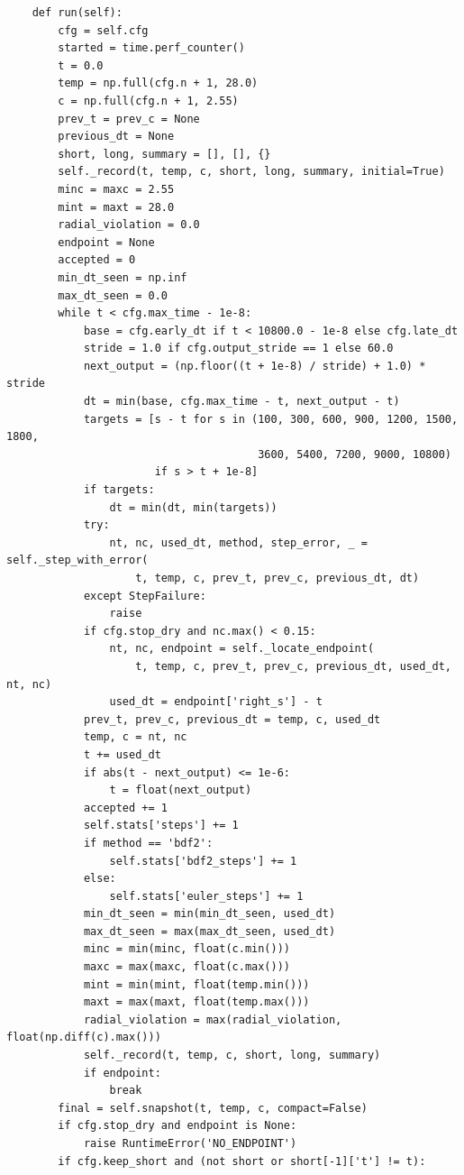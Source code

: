 \begin{verbatim}
    def run(self):
        cfg = self.cfg
        started = time.perf_counter()
        t = 0.0
        temp = np.full(cfg.n + 1, 28.0)
        c = np.full(cfg.n + 1, 2.55)
        prev_t = prev_c = None
        previous_dt = None
        short, long, summary = [], [], {}
        self._record(t, temp, c, short, long, summary, initial=True)
        minc = maxc = 2.55
        mint = maxt = 28.0
        radial_violation = 0.0
        endpoint = None
        accepted = 0
        min_dt_seen = np.inf
        max_dt_seen = 0.0
        while t < cfg.max_time - 1e-8:
            base = cfg.early_dt if t < 10800.0 - 1e-8 else cfg.late_dt
            stride = 1.0 if cfg.output_stride == 1 else 60.0
            next_output = (np.floor((t + 1e-8) / stride) + 1.0) * stride
            dt = min(base, cfg.max_time - t, next_output - t)
            targets = [s - t for s in (100, 300, 600, 900, 1200, 1500, 1800,
                                       3600, 5400, 7200, 9000, 10800)
                       if s > t + 1e-8]
            if targets:
                dt = min(dt, min(targets))
            try:
                nt, nc, used_dt, method, step_error, _ = self._step_with_error(
                    t, temp, c, prev_t, prev_c, previous_dt, dt)
            except StepFailure:
                raise
            if cfg.stop_dry and nc.max() < 0.15:
                nt, nc, endpoint = self._locate_endpoint(
                    t, temp, c, prev_t, prev_c, previous_dt, used_dt, nt, nc)
                used_dt = endpoint['right_s'] - t
            prev_t, prev_c, previous_dt = temp, c, used_dt
            temp, c = nt, nc
            t += used_dt
            if abs(t - next_output) <= 1e-6:
                t = float(next_output)
            accepted += 1
            self.stats['steps'] += 1
            if method == 'bdf2':
                self.stats['bdf2_steps'] += 1
            else:
                self.stats['euler_steps'] += 1
            min_dt_seen = min(min_dt_seen, used_dt)
            max_dt_seen = max(max_dt_seen, used_dt)
            minc = min(minc, float(c.min()))
            maxc = max(maxc, float(c.max()))
            mint = min(mint, float(temp.min()))
            maxt = max(maxt, float(temp.max()))
            radial_violation = max(radial_violation, float(np.diff(c).max()))
            self._record(t, temp, c, short, long, summary)
            if endpoint:
                break
        final = self.snapshot(t, temp, c, compact=False)
        if cfg.stop_dry and endpoint is None:
            raise RuntimeError('NO_ENDPOINT')
        if cfg.keep_short and (not short or short[-1]['t'] != t):

\end{verbatim}
